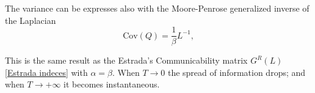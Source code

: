 The variance can be expresses also with the Moore-Penrose generalized inverse of the Laplacian
\begin{equation}\label{classic_correlation}
    \mathrm{Cov}(Q) = \frac{1}{\beta}L^{-1},
\end{equation}

This is the same result as the Estrada's Communicability matrix $G^R(L)$ \eqref{Estrada indeces} with $\alpha=\beta$.
When $T\rightarrow 0$ the spread of information drops; and when $T\rightarrow +\infty$ it becomes instantaneous.